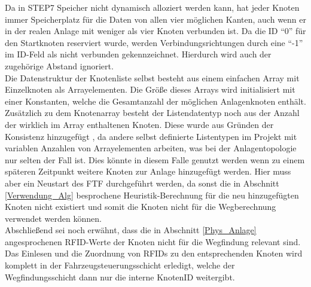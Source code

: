 			Da in \ac{STEP7} Speicher nicht dynamisch alloziert werden kann, hat jeder Knoten immer Speicherplatz für die Daten von allen vier möglichen Kanten, auch wenn er in der realen Anlage mit weniger als vier Knoten verbunden ist. Da die ID "`0"' für den Startknoten reserviert wurde, werden Verbindungsrichtungen durch eine "`-1"' im ID-Feld als nicht verbunden gekennzeichnet. Hierdurch wird auch der zugehörige Abstand ignoriert.
			\\[4pt]
			Die Datenstruktur der Knotenliste selbst besteht aus einem einfachen Array mit Einzelknoten als Arrayelementen. Die Größe dieses Arrays wird initialisiert mit einer Konstanten, welche die Gesamtanzahl der möglichen Anlagenknoten enthält. Zusätzlich zu dem Knotenarray besteht der Listendatentyp noch aus der Anzahl der wirklich im Array enthaltenen Knoten. Diese wurde aus Gründen der Konsistenz hinzugefügt , da andere selbst definierte Listentypen im Projekt mit variablen Anzahlen von Arrayelementen arbeiten, was bei der Anlagentopologie nur selten der Fall ist. Dies könnte in diesem Falle genutzt werden wenn zu einem späteren Zeitpunkt weitere Knoten zur Anlage hinzugefügt werden. Hier muss aber ein Neustart des \ac{FTF} durchgeführt werden, da sonst die in Abschnitt \ref{Verwendung_Alg} besprochene Heuristik-Berechnung für die neu hinzugefügten Knoten nicht existiert und somit die Knoten nicht für die Wegberechnung verwendet werden können.
			\\[4pt]
			Abschließend sei noch erwähnt, dass die in Abschnitt \ref{Phys_Anlage} angesprochenen \ac{RFID}-Werte der Knoten nicht für die Wegfindung relevant sind. Das Einlesen und die Zuordnung von \ac{RFID}s zu den entsprechenden Knoten wird komplett in der Fahrzeugsteuerungsschicht erledigt, welche der Wegfindungsschicht dann nur die interne KnotenID weitergibt.
			
